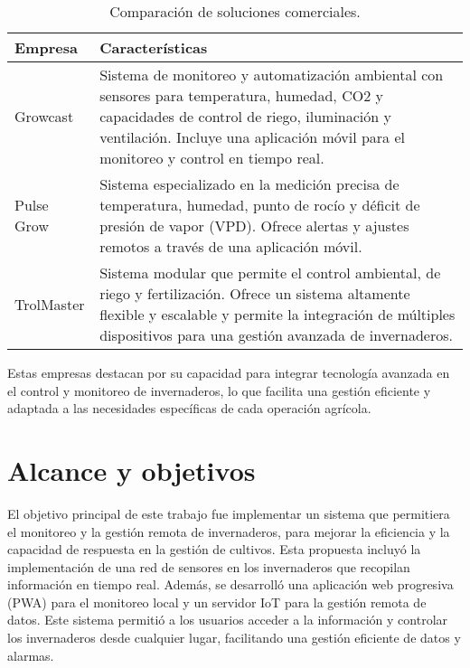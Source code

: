 \begin{table}[h]
	\centering
	\caption[Comparación de soluciones comerciales]{Comparación de soluciones comerciales.}
	\begin{tabular}{l p{10cm}}    
		\toprule
		\textbf{Empresa} 	 & \textbf{Características}  \\
		\midrule
		Growcast \citep{Growcast} & Sistema de monitoreo y automatización ambiental con sensores para temperatura, humedad, CO2 y capacidades de control de riego, iluminación y ventilación. Incluye una aplicación móvil para el monitoreo y control en tiempo real. \\		
		Pulse Grow \citep{pulsegrow}	 & Sistema especializado en la medición precisa de temperatura, humedad, punto de rocío y déficit de presión de vapor (VPD). Ofrece alertas y ajustes remotos a través de una aplicación móvil. \\
		TrolMaster \citep{trolmaster}	 & Sistema modular que permite el control ambiental, de riego y fertilización. Ofrece un sistema altamente flexible y escalable y permite la integración de múltiples dispositivos para una gestión avanzada de invernaderos. \\
		\bottomrule
	\end{tabular}
	\label{tabla:empresas_invernaderos}
\end{table}


Estas empresas destacan por su capacidad para integrar tecnología avanzada en el control y monitoreo de invernaderos, lo que facilita una gestión eficiente y adaptada a las necesidades específicas de cada operación agrícola.




\section{Alcance y objetivos}

El objetivo principal de este trabajo fue implementar un sistema que permitiera el monitoreo y la gestión remota de invernaderos, para mejorar la eficiencia y la capacidad de respuesta en la gestión de cultivos. Esta propuesta incluyó la implementación de una red de sensores en los invernaderos que recopilan información en tiempo real. Además, se desarrolló una aplicación web progresiva (PWA) para el monitoreo local y un servidor IoT para la gestión remota de datos. Este sistema permitió a los usuarios acceder a la información y controlar los invernaderos desde cualquier lugar, facilitando una gestión eficiente de datos y alarmas.

